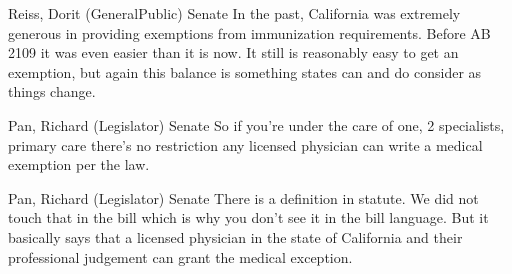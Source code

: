 \begin{result}{15.542348794795622}{Reiss, Dorit (GeneralPublic) Senate}
In the past, California was extremely generous in providing exemptions from immunization requirements. Before AB 2109 it was even easier than it is now. It still is reasonably easy to get an exemption, but again this balance is something states can and do consider as things change.
\end{result}

\begin{result}{14.421991099835951}{Pan, Richard (Legislator) Senate}
So if you're under the care of one, 2 specialists, primary care there's no restriction any licensed physician can write a medical exemption per the law.
\end{result}

\begin{result}{13.499722256772912}{Pan, Richard (Legislator) Senate}
There is a definition in statute. We did not touch that in the bill which is why you don't see it in the bill language. But it basically says that a licensed physician in the state of California and their professional judgement can grant the medical exception.
\end{result}

